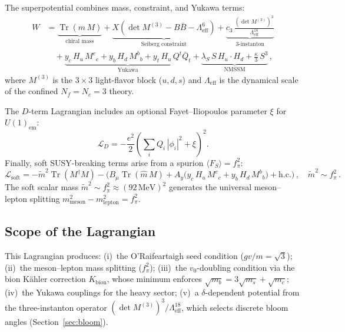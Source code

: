 \documentclass[12pt,a4paper]{article}
\newcommand{\MeV}{\,\text{MeV}}
\newcommand{\fpi}{f_\pi}
\begin{document}
The superpotential combines mass, constraint, and Yukawa terms:
\begin{equation}
\begin{split}
  W &= \underbrace{\operatorname{Tr}(\hat m\, M)}_{\text{chiral mass}}
    + \underbrace{X\!\left(\det M^{(3)} - B\bar B
      - \Lambda_{\text{eff}}^{6}\right)}_{\text{Seiberg constraint}}
    + \underbrace{c_3\,\frac{(\det M^{(3)})^3}
      {\Lambda_{\text{eff}}^{18}}}_{\text{3-instanton}}\\
  &\quad  + \underbrace{y_c\, H_u\, M^c{}_c
      + y_b\, H_d\, M^b{}_b
      + y_t\, H_u\, Q^t \bar Q_t}_{\text{Yukawa}}
    + \underbrace{\lambda_S\, S\, H_u\!\cdot\!H_d
      + \tfrac{\kappa}{3}\,S^3}_{\text{NMSSM}}\,,
\end{split}
\end{equation}
where $M^{(3)}$ is the $3\times 3$ light-flavor block ($u,d,s$)
and $\Lambda_{\text{eff}}$ is the dynamical scale of the confined
$N_f = N_c = 3$ theory.

The $D$-term Lagrangian includes an optional Fayet--Iliopoulos
parameter $\xi$ for $U(1)_{\text{em}}$:
\begin{equation}
  \mathcal{L}_D
  = -\frac{e^2}{2}\!\left(\sum_i Q_i\,|\phi_i|^2
    + \xi\right)^{\!2}.
\end{equation}
Finally, soft SUSY-breaking terms arise from a spurion
$\langle F_S\rangle = \fpi^2$:
\begin{equation}
  \mathcal{L}_{\text{soft}}
  = -\tilde m^2 \operatorname{Tr}(M^\dagger M)
  - \bigl(B_\mu\operatorname{Tr}(\hat m\, M)
    + A_y\bigl(y_c\, H_u\, M^c{}_c + y_b\, H_d\, M^b{}_b\bigr) + \text{h.c.}\bigr)\,,
  \quad
  \tilde m^2 \sim \fpi^2\,.
\end{equation}
The soft scalar mass $\tilde m^2 \sim \fpi^2 \approx (92\MeV)^2$
generates the universal meson--lepton splitting
$m^2_{\text{meson}} - m^2_{\text{lepton}} = \fpi^2$.

\subsection{Scope of the Lagrangian}

This Lagrangian produces: (i)~the O'Raifeartaigh seed condition ($gv/m = \sqrt{3}$);
(ii)~the meson--lepton mass splitting ($\fpi^2$);
(iii)~the $v_0$-doubling condition via the bion K\"ahler
correction $K_{\text{bion}}$, whose minimum enforces
$\sqrt{m_b} = 3\sqrt{m_s} + \sqrt{m_c}$;
(iv)~the Yukawa couplings for the heavy sector;
(v)~a $\delta$-dependent potential from the three-instanton operator
$(\det M^{(3)})^3/\Lambda_{\text{eff}}^{18}$, which selects
discrete bloom angles (Section~\ref{sec:bloom}).
\end{document}
